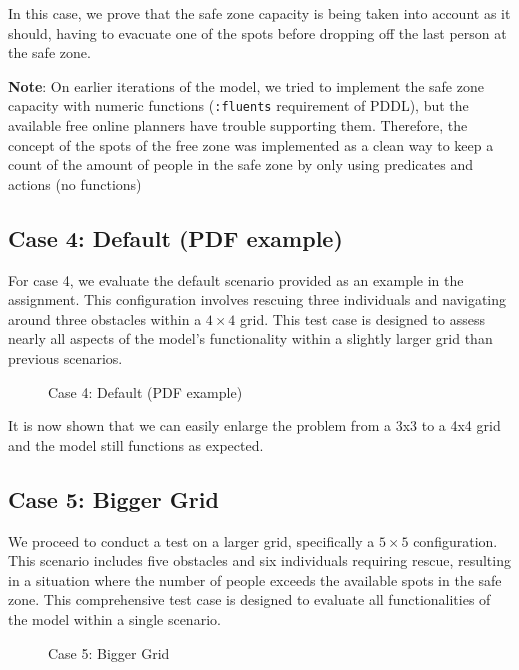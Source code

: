 \documentclass{article}
\begin{document}
In this case, we prove that the safe zone capacity is being taken into account as it should, having to evacuate one of the spots before dropping off the last person at the safe zone.

\textbf{Note}: On earlier iterations of the model, we tried to implement the safe zone capacity with numeric functions (\texttt{:fluents} requirement of PDDL), but the available free online planners have trouble supporting them. Therefore, the concept of the spots of the free zone was implemented as a clean way to keep a count of the amount of people in the safe zone by only using predicates and actions (no functions)

\subsection{Case 4: Default (PDF example)}

For case 4, we evaluate the default scenario provided as an example in the assignment. This configuration involves rescuing three individuals and navigating around three obstacles within a \(4 \times 4\) grid. This test case is designed to assess nearly all aspects of the model's functionality within a slightly larger grid than previous scenarios.

\begin{figure}[ht]
    \centering
    \caption{Case 4: Default (PDF example)}
    \label{fig:initial-state-default}
\end{figure}
\FloatBarrier

It is now shown that we can easily enlarge the problem from a 3x3 to a 4x4 grid and the model still functions as expected.

\subsection{Case 5: Bigger Grid}

We proceed to conduct a test on a larger grid, specifically a \(5 \times 5\) configuration. This scenario includes five obstacles and six individuals requiring rescue, resulting in a situation where the number of people exceeds the available spots in the safe zone. This comprehensive test case is designed to evaluate all functionalities of the model within a single scenario.

\begin{figure}[ht]
    \centering
    \caption{Case 5: Bigger Grid}
    \label{fig:initial-state-bigger-grid}
\end{figure}
\FloatBarrier
\end{document}
